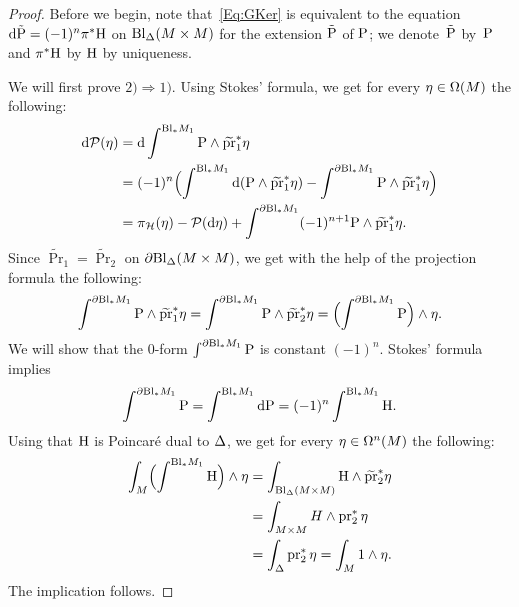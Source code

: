 \documentclass[\MainFolder/Text.tex]{subfiles}
\begin{document}
\begin{proof} %
Before we begin, note that~\eqref{Eq:GKer} is equivalent to the equation $\mathrm{d} \tilde{\mathrm{P}} = (-1)^n \pi^* \mathrm{H}$ on $\mathrm{Bl}_\Delta(M\times M)$ for the extension $\tilde{\mathrm{P}}$ of $\mathrm{P}$; we denote~$\tilde{\mathrm{P}}$ by~$\mathrm{P}$ and $\pi^*\mathrm{H}$ by $\mathrm{H}$ by uniqueness.

We will first prove $2) \Longrightarrow 1)$.
Using Stokes' formula, we get for every $\eta\in \Omega(M)$ the following:
%
\begin{align*}
  \mathrm{d} \mathcal{P} (\eta) &= \mathrm{d} \int^{\mathrm{Bl}_* M_1} \mathrm{P}\wedge \widetilde{\operatorname{\mathrm{pr}}}_1^* \eta \\ 
  &= (-1)^n \Bigl( \int^{\mathrm{Bl}_* M_1} \mathrm{d}(\mathrm{P}\wedge\widetilde{\operatorname{\mathrm{pr}}}_1^* \eta) - \int^{\partial \mathrm{Bl}_* M_1} \mathrm{P} \wedge \widetilde{\operatorname{\mathrm{pr}}}_1^* \eta \Bigr) \\ 
  &= \operatorname{\pi_{\mathcal{H}}}(\eta) - \mathcal{P}(\mathrm{d}\eta) +  \int^{\partial \mathrm{Bl}_* M_1} (-1)^{n+1}\mathrm{P}\wedge \widetilde{\operatorname{\mathrm{pr}}}_1^*\eta.
\end{align*}
Since $\widetilde{\Pr}_1 = \widetilde{\Pr}_2$ on $\partial \mathrm{Bl}_\Delta (M\times M)$, we get with the help of the projection formula the following:
\begin{equation*}
 \int^{\partial \mathrm{Bl}_* M_1} \mathrm{P}\wedge \widetilde{\operatorname{\mathrm{pr}}}_1^*\eta  = \int^{\partial \mathrm{Bl}_* M_1} \mathrm{P}\wedge \widetilde{\operatorname{\mathrm{pr}}}_2^*\eta = \Bigl(\int^{\partial \mathrm{Bl}_* M_1} \mathrm{P} \Bigr)\wedge\eta.
\end{equation*}
We will show that the $0$-form $\int^{\partial \mathrm{Bl}_* M_1} \mathrm{P}$ is constant $(-1)^n$.
Stokes' formula implies
\begin{equation*}
 \int^{\partial \mathrm{Bl}_* M_1} \mathrm{P} = \int^{\mathrm{Bl}_* M_1} \mathrm{d} \mathrm{P} = (-1)^n \int^{\mathrm{Bl}_* M_1} \mathrm{H}. 
\end{equation*}
Using that $\mathrm{H}$ is Poincar\'e dual to $\Delta$, we get for every $\eta\in \Omega^n(M)$ the following:
%
\begin{align*}
 \int_M \Bigl(\int^{\mathrm{Bl}_* M_1} \mathrm{H} \Bigr) \wedge \eta &= \int_{\mathrm{Bl}_\Delta(M\times M)} \mathrm{H}\wedge \widetilde{\operatorname{\mathrm{pr}}}_2^*\eta 
 \\ &= \int_{M\times M} H\wedge \operatorname{\mathrm{pr}}_2^*\eta  \\ &= \int_\Delta \operatorname{\mathrm{pr}}_2^*\eta  = \int_M 1\wedge \eta.
\end{align*}
The implication follows.


\end{proof}
\end{document}
